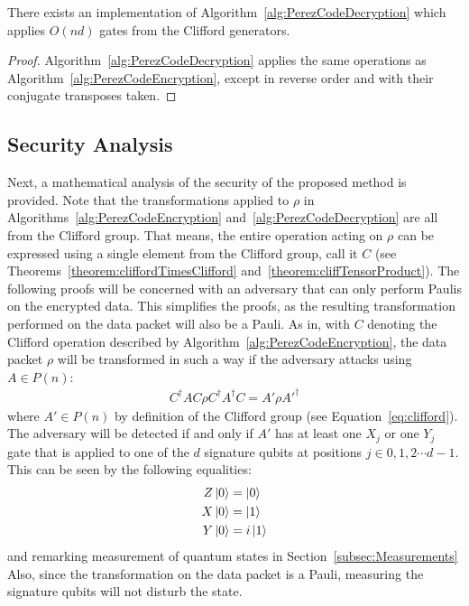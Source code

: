 \begin{corollary}
There exists an implementation of Algorithm~\ref{alg:PerezCodeDecryption} which applies $O \left(nd \right)$ gates from the Clifford generators.
\end{corollary}
\begin{proof}
Algorithm~\ref{alg:PerezCodeDecryption} applies the same operations as Algorithm~\ref{alg:PerezCodeEncryption}, except in reverse order and with their conjugate transposes taken.
\end{proof}

\subsection{Security Analysis}
Next, a mathematical analysis of the security of the proposed method is provided. Note that the transformations applied to $\rho$ in Algorithms~\ref{alg:PerezCodeEncryption} and~\ref{alg:PerezCodeDecryption} are all from the Clifford group. That means, the entire operation acting on $\rho$ can be expressed using a single element from the Clifford group, call it $C$ (see Theorems~\ref{theorem:cliffordTimesClifford} and~\ref{theorem:cliffTensorProduct}). The following proofs will be concerned with an adversary that can only perform Paulis on the encrypted data. This simplifies the proofs, as the resulting transformation performed on the data packet will also be a Pauli. As in, with $C$ denoting the Clifford operation described by Algorithm~\ref{alg:PerezCodeEncryption}, the data packet $\rho$ will be transformed in such a way if the adversary attacks using $A \in P(n)$: 
\begin{align}
C^{\dagger}AC \rho C^{\dagger}A^{\dagger}C = A' \rho A'^{\dagger}
\end{align}
where $A' \in P(n)$ by definition of the Clifford group (see Equation~\eqref{eq:clifford}). The adversary will be detected if and only if $A'$ has at least one $X_j$ or one $Y_j$ gate that is applied to one of the $d$ signature qubits at positions $j \in {0, 1, 2 \cdots d-1}$. This can be seen by the following equalities:
\begin{align}
Z\ket{0} &= \ket{0}\\
X\ket{0} &= \ket{1}\\
Y\ket{0} &= i\ket{1}
\end{align}
and remarking measurement of quantum states in Section~\ref{subsec:Measurements} Also, since the transformation on the data packet is a Pauli, measuring the signature qubits will not disturb the state.

